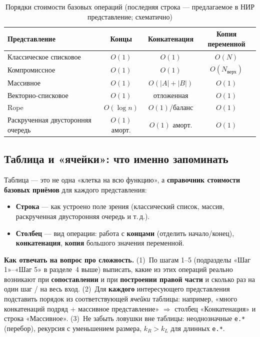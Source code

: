 \documentclass[12pt,a4paper]{article}
\begin{document}
\begin{table}[h]
\centering
\begin{tabular}{@{}lccc@{}}
\toprule
Представление & Концы & Конкатенация & Копия переменной \\
\midrule
Классическое списковое & \(O(1)\) & \(O(1)\) & \(O(N)\) \\
Компромиссное & \(O(1)\) & \(O(1)\) & \(O(N_{\text{верх}})\) \\
Массивное & \(O(1)\) & \(O(|A|+|B|)\) & \(O(1)\) \\
Векторно-списковое & \(O(1)\) & отложенная & \(O(1)\) \\
Rope & \(O(\log n)\) & \(O(1)\)/баланс & \(O(1)\) \\
\parbox[t]{3.35cm}{\raggedright Раскрученная двусторонняя очередь} & \(O(1)\) аморт. & \(O(1)\) аморт. & \(O(1)\) \\
\bottomrule
\end{tabular}
\caption{Порядки стоимости базовых операций (последняя строка --- предлагаемое в НИР представление; схематично)}
\end{table}

\subsection{Таблица и «ячейки»: что именно запоминать}

Таблица --- это не одна «клетка на всю функцию», а \textbf{справочник стоимости базовых приёмов} для каждого представления:
\begin{itemize}
  \item \textbf{Строка} --- как устроено поле зрения (классический список, массив, раскрученная двусторонняя очередь и т.\,д.).
  \item \textbf{Столбец} --- вид операции: работа с \textbf{концами} (отделить начало/конец), \textbf{конкатенация}, \textbf{копия} большого значения переменной.
\end{itemize}

\textbf{Как отвечать на вопрос про сложность.} (1)~По шагам 1--5 (подразделы «Шаг 1»--«Шаг 5» в разделе~4 выше) выписать, какие из этих операций реально возникают при \textbf{сопоставлении} и при \textbf{построении правой части} и сколько раз на один шаг / на весь вход. (2)~Для \textbf{каждого} интересующего представления подставить порядок из соответствующей \emph{ячейки} таблицы: например, «много конкатенаций подряд + массивное представление» $\Rightarrow$ столбец «Конкатенация» и строка «Массивное». (3)~Не забыть ловушки вне таблицы: неоднозначные \texttt{e.*} (перебор), рекурсия с уменьшением размера, \(k_R>k_L\) для длинных \texttt{e.*}.
\end{document}
